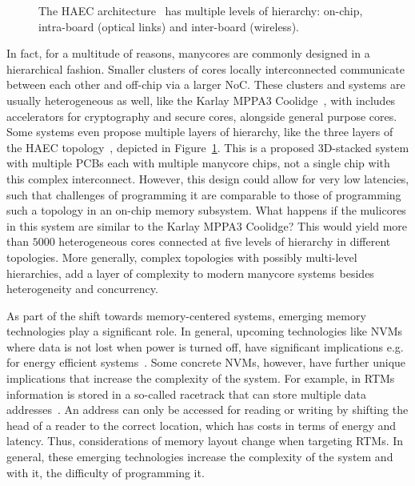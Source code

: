 \begin{figure}[h]
	\centering
   \resizebox{0.5\textwidth}{!}{}
   \caption{The \acs*{HAEC} architecture~\cite{HAEC} has multiple levels of hierarchy: on-chip, intra-board (optical links) and inter-board (wireless).} 
	\label{fig:haec}
\end{figure}

In fact, for a multitude of reasons, manycores are commonly designed in a hierarchical fashion.
Smaller clusters of cores locally interconnected communicate between each other and off-chip via a larger \ac{NoC}.
These clusters and systems are usually heterogeneous as well, like the Karlay MPPA3 Coolidge~\cite{coolidge}, with includes accelerators for cryptography and secure cores, alongside general purpose cores.
Some systems even propose multiple layers of hierarchy, like the three layers of the \ac{HAEC} topology~\cite{HAEC}, depicted in Figure~\ref{fig:haec}.
This is a proposed 3D-stacked system with multiple \acp{PCB} each with multiple manycore chips, not a single chip with this complex interconnect.
However, this design could allow for very low latencies, such that challenges of programming it are comparable to those of programming such a topology in an on-chip memory subsystem.
What happens if the mulicores in this system are similar to the Karlay MPPA3 Coolidge? This would yield more than $5000$ heterogeneous cores connected at five levels of hierarchy in different topologies.
More generally, complex topologies with possibly multi-level hierarchies, add a layer of complexity to modern manycore systems besides heterogeneity and concurrency.

As part of the shift towards memory-centered systems, emerging memory technologies play a significant role.
In general, upcoming technologies like \acp{NVM} where data is not lost when power is turned off, have significant implications e.g. for energy efficient systems~\cite{meena2014nvm,mittal2014survey}.
Some concrete \acp{NVM}, however, have further unique implications that increase the complexity of the system.
For example, in \acp{RTM} information is stored in a so-called racetrack that can store multiple data addresses~\cite{rtm}.
An address can only be accessed for reading or writing by shifting the head of a reader to the correct location, which has costs in terms of energy and latency.
Thus, considerations of memory layout change when targeting \acp{RTM}.
In general, these emerging technologies increase the complexity of the system and with it, the difficulty of programming it.

